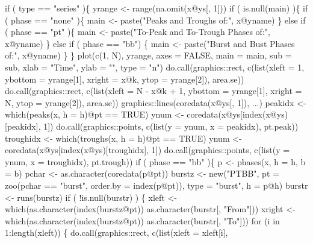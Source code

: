 \documentclass[a4paper]{article}
\begin{document}
        if ( type == "series" )\{
            yrange <- range(na.omit(x@ys[, 1]))
            if ( is.null(main) )\{
                if ( phase == "none" )\{
                    main <- paste("Peaks and Troughs of:", x@yname)
                \} else if ( phase == "pt" )\{
                    main <- paste("To-Peak and To-Trough Phases of:", x@yname)
                \}
                else if ( phase == "bb") \{
                    main <- paste("Burst and Bust Phases of:", x@yname)
                \}
            \}
            plot(c(1, N), yrange, axes = FALSE,
                 main = main, sub = sub,
                 xlab = "Time", ylab = "", type = "n")
            do.call(graphics::rect, c(list(xleft = 1,
                                           ybottom = yrange[1],
                                           xright = x@k,
                                           ytop = yrange[2]),
                                      area.se))
            do.call(graphics::rect, c(list(xleft = N - x@k + 1,
                                           ybottom = yrange[1],
                                           xright = N,
                                           ytop = yrange[2]),
                                      area.se))
            graphics::lines(coredata(x@ys[, 1]), ...)
            peakidx <- which(peaks(x, h = h)@pt == TRUE)
            ynum <- coredata(x@ys[index(x@ys)[peakidx], 1])
            do.call(graphics::points, c(list(y = ynum, x = peakidx),
                                        pt.peak))
            troughidx <- which(troughs(x, h = h)@pt == TRUE)
            ynum <- coredata(x@ys[index(x@ys)[troughidx], 1])
            do.call(graphics::points, c(list(y = ynum, x = troughidx),
                                        pt.trough))
            if ( phase  == "bb" )\{
                p <- phases(x, h = h, b = b)
                pchar <- as.character(coredata(p@pt))
                burstz <- new("PTBB",
                              pt = zoo(pchar == "burst",
                                       order.by = index(p@pt)),
                              type = "burst",
                              h = p@h)
                burstr <- runs(burstz)
                if ( !is.null(burstr) ) \{
                    xleft <- which(as.character(index(burstz@pt)) %
                                   as.character(burstr[, "From"]))
                    xright <- which(as.character(index(burstz@pt)) %
                                    as.character(burstr[, "To"]))
                    for (i in 1:length(xleft)) \{
                        do.call(graphics::rect, c(list(xleft = xleft[i],
\end{document}
